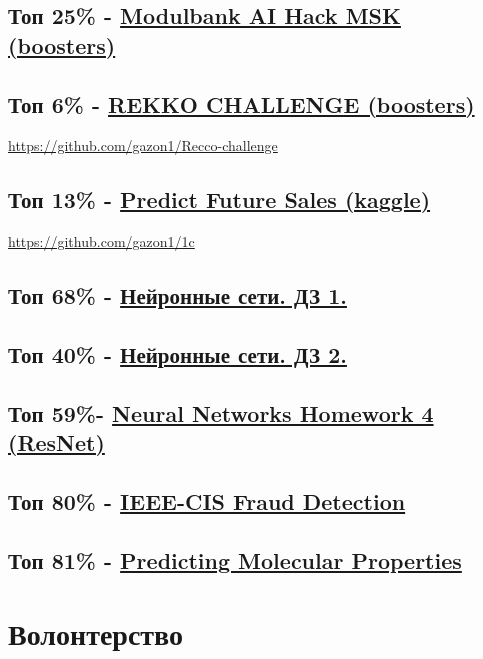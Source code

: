 \documentclass[11pt]{article}
\begin{document}
\subsection{Топ 25\% - \href{https://boosters.pro/championship/modulbank1}{Modulbank AI Hack MSK (boosters)}}
\label{sec:org34f57e8}
\subsection{Топ 6\% - \href{https://boosters.pro/championship/rekko\_challenge/overview}{REKKO CHALLENGE (boosters)}}
\label{sec:org4df85bd}
\url{https://github.com/gazon1/Recco-challenge}

\subsection{Топ 13\% - \href{https://www.kaggle.com/c/competitive-data-science-predict-future-sales}{Predict Future Sales (kaggle)}}
\label{sec:org82caff6}
\url{https://github.com/gazon1/1c}

\subsection{Топ 68\% - \href{https://www.kaggle.com/c/2019s-neuralnet-track}{Нейронные сети. ДЗ 1.}}
\label{sec:orgf4b5f6f}
\subsection{Топ 40\% - \href{https://www.kaggle.com/c/nn-track-2019-spring-hw2}{Нейронные сети. ДЗ 2.}}
\label{sec:org56b2b2d}
\subsection{Топ 59\%- \href{https://www.kaggle.com/c/neuralnetworkshomework4/leaderboard}{Neural Networks Homework 4 (ResNet)}}
\label{sec:orgaf3befd}
\subsection{Топ 80\% - \href{https://www.kaggle.com/c/ieee-fraud-detection}{IEEE-CIS Fraud Detection}}
\label{sec:orge0e09cb}
\subsection{Топ 81\% - \href{https://www.kaggle.com/c/champs-scalar-coupling}{Predicting Molecular Properties}}
\label{sec:orgf9b04ba}
\section{Волонтерство}
\label{sec:orgf7789ef}
\end{document}
